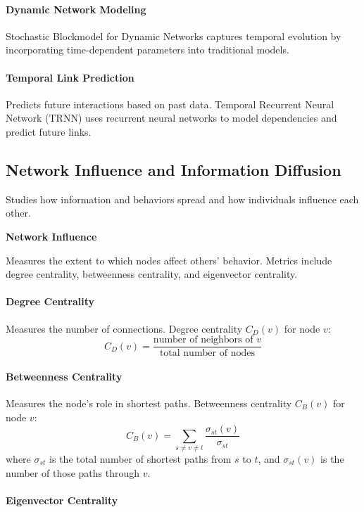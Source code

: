 \documentclass[12pt]{book} %
\begin{document}
\paragraph{Dynamic Network Modeling}

Stochastic Blockmodel for Dynamic Networks captures temporal evolution by incorporating time-dependent parameters into traditional models.

\paragraph{Temporal Link Prediction}

Predicts future interactions based on past data. Temporal Recurrent Neural Network (TRNN) uses recurrent neural networks to model dependencies and predict future links.

\subsection{Network Influence and Information Diffusion}

Studies how information and behaviors spread and how individuals influence each other.

\textbf{Network Influence}

Measures the extent to which nodes affect others' behavior. Metrics include degree centrality, betweenness centrality, and eigenvector centrality.

\paragraph{Degree Centrality}

Measures the number of connections. Degree centrality \(C_D(v)\) for node \(v\):
\[ C_D(v) = \frac{\text{number of neighbors of } v}{\text{total number of nodes}} \]

\paragraph{Betweenness Centrality}

Measures the node's role in shortest paths. Betweenness centrality \(C_B(v)\) for node \(v\):
\[ C_B(v) = \sum_{s \neq v \neq t} \frac{\sigma_{st}(v)}{\sigma_{st}} \]
where \(\sigma_{st}\) is the total number of shortest paths from \(s\) to \(t\), and \(\sigma_{st}(v)\) is the number of those paths through \(v\).

\paragraph{Eigenvector Centrality}
\end{document}

